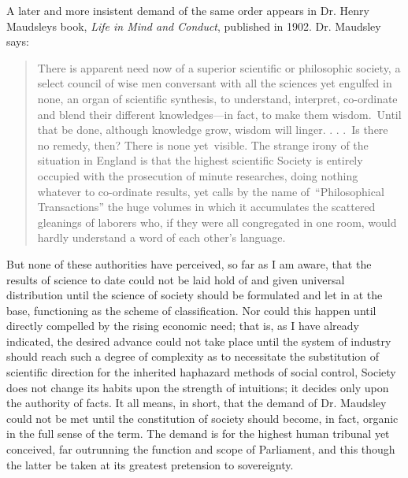 \documentclass[twoside,symmetric,nobib,justified]{tufte-book}
\begin{document}
A later and more insistent demand of the same order appears in Dr. Henry
Maudsley\textquotesingle s book, \emph{Life in Mind and Conduct},
published in 1902. Dr. Maudsley says:

\begin{quote}
There is apparent need now of a superior scientific or philosophic
society, a select council of wise men conversant with all the sciences
yet engulfed in none, an organ of scientific synthesis, to understand,
interpret, co-ordinate and blend their different knowledges---in fact,
to make them wisdom.~Until that be done, although knowledge grow, wisdom
will linger. . . .~Is there no remedy, then? There is none yet~visible.
The strange irony of the situation in England is that the highest
scientific Society is entirely occupied with the prosecution of minute
researches, doing nothing whatever to co-ordinate results, yet calls by
the name of~``Philosophical Transactions'' the huge volumes in which it
accumulates the scattered gleanings of laborers who, if they were all
congregated in one room, would hardly understand a word of each other's
language.
\end{quote}

But none of these authorities have perceived, so far as I am aware, that
the results of science to date could not be laid hold of and given
universal distribution until the science of society should be formulated
and let in at the base, functioning as the scheme of classification. Nor
could this happen until directly compelled by the rising economic need;
that is, as I have already indicated, the desired advance could not take
place until the system of industry should reach such a degree of
complexity as to necessitate the substitution of scientific direction
for the inherited haphazard methods of social control, Society does not
change its habits upon the strength of intuitions; it decides only upon
the authority of facts. It all means, in short, that the demand of Dr.
Maudsley could not be met until the constitution of society should
become, in fact, organic in the full sense of the term. The demand is
for the highest human tribunal yet conceived, far outrunning the
function and scope of Parliament, and this though the latter be taken at
its greatest pretension to sovereignty.~
\end{document}
